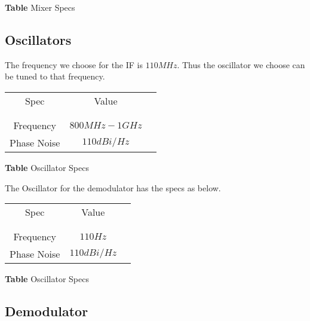 \documentclass[]{article}
\begin{document}
        \begin{center}
            \textbf{Table} Mixer Specs
        \end{center}

    \subsection{Oscillators}
        The frequency we choose for the IF is $110MHz$. Thus the oscillator we
        choose can be tuned to that frequency.

        \begin{center}
            \begin{tabular}{c c c}
                Spec & Value \\ \\ \hline \\
                Frequency & $800MHz-1GHz$ \\
                Phase Noise & $110dBi/Hz$ \\
            \end{tabular}
        \end{center}

        \begin{center}
            \textbf{Table} Oscillator Specs
        \end{center}

        The Oscillator for the demodulator has the specs as below.

        \begin{center}
            \begin{tabular}{c c c}
                Spec & Value \\ \\ \hline \\
                Frequency & $110Hz$ \\
                Phase Noise & $110dBi/Hz$ \\
            \end{tabular}
        \end{center}

        \begin{center}
            \textbf{Table} Oscillator Specs
        \end{center}

    \subsection{Demodulator}
        
\end{document}
